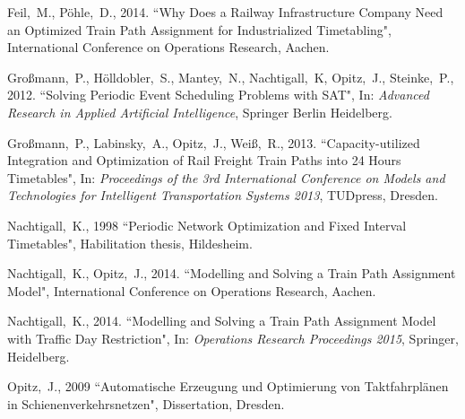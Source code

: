 \documentclass[10pt,a4paper,oneside,onecolumn]{article}
\begin{document}
\begin{thebibliography}{99}
	\setlength{\itemsep}{0\parskip}

	Feil,~M., P\"ohle,~D., 2014.
	{``Why Does a Railway Infrastructure Company Need an Optimized Train Path Assignment for Industrialized Timetabling"},
	International Conference on Operations Research,
	Aachen.
	
	Gro{\ss}mann,~P., H\"olldobler,~S., Mantey,~N., Nachtigall,~K, Opitz,~J., Steinke,~P., 2012.
	``Solving Periodic Event Scheduling Problems with SAT",
	In: {\em Advanced Research in Applied Artificial Intelligence},
	Springer Berlin Heidelberg.
	
	Gro{\ss}mann,~P., Labinsky,~A., Opitz,~J., Wei{\ss},~R., 2013.
	``Capacity-utilized Integration and Optimization of Rail Freight Train Paths into 24 Hours Timetables",
	In: {\em Proceedings of the 3rd International Conference on Models and Technologies for Intelligent Transportation Systems 2013},
	TUDpress, Dresden.	
	
	Nachtigall,~K., 1998
	{``Periodic Network Optimization and Fixed Interval Timetables"},
	Habilitation thesis,
	Hildesheim.
	
	Nachtigall,~K., Opitz,~J., 2014.
	{``Modelling and Solving a Train Path Assignment Model"},
	International Conference on Operations Research,
	Aachen.
	
	Nachtigall,~K., 2014.
	{``Modelling and Solving a Train Path Assignment Model with Traffic Day Restriction"},
	In: {\em Operations Research Proceedings 2015},
	Springer, Heidelberg.	
	
	Opitz,~J., 2009
	{``Automatische Erzeugung und Optimierung von Taktfahrplänen in Schienenverkehrsnetzen"},
	Dissertation,
	Dresden.

	
\end{thebibliography}

\end{document}

